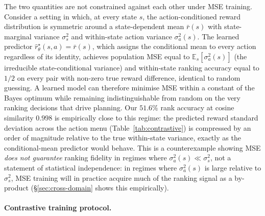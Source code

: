 \documentclass[11pt]{article}
\begin{document}
The two quantities are not constrained against each other under MSE training. Consider a setting in which, at every state $s$, the action-conditioned reward distribution is symmetric around a state-dependent mean $\bar{r}(s)$ with state-marginal variance $\sigma_s^2$ and within-state action variance $\sigma_a^2(s)$. The learned predictor $\hat{r}_\theta^{\star}(s,a) = \bar{r}(s)$, which assigns the conditional mean to every action regardless of its identity, achieves population MSE equal to $\mathbb{E}_s[\sigma_a^2(s)]$ (the irreducible state-conditional variance) and within-state ranking accuracy equal to $1/2$ on every pair with non-zero true reward difference, identical to random guessing. A learned model can therefore minimise MSE within a constant of the Bayes optimum while remaining indistinguishable from random on the very ranking decisions that drive planning. Our $51.6\%$ rank accuracy at cosine similarity $0.998$ is empirically close to this regime: the predicted reward standard deviation across the action menu (Table~\ref{tab:contrastive}) is compressed by an order of magnitude relative to the true within-state variance, exactly as the conditional-mean predictor would behave. This is a counterexample showing MSE \emph{does not guarantee} ranking fidelity in regimes where $\sigma_a^2(s) \ll \sigma_s^2$, not a statement of statistical independence: in regimes where $\sigma_a^2(s)$ is large relative to $\sigma_s^2$, MSE training will in practice acquire much of the ranking signal as a by-product (\S\ref{sec:cross-domain} shows this empirically).

\paragraph{Contrastive training protocol.}\label{sec:methods-contrastive}
\end{document}
